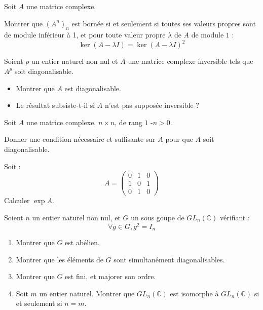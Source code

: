 \begin{exer}
Soit $A$ une matrice complexe.

Montrer que $(A^n)_n$ est bornée si et seulement si %
toutes ses valeurs propres sont de module inférieur à 1, et pour toute valeur propre $\lambda$ de $A$ de module $1$ :
\[\ker (A - \lambda I) = \ker (A - \lambda I)^2\]
\end{exer}

\begin{exer}
Soient $p$ un entier naturel non nul et $A$ une matrice complexe inversible tels que $A^p$ soit diagonalisable.
\begin{itemize}
\item Montrer que $A$ est diagonalisable.
\item Le résultat subsiste-t-il si $A$ n'est pas supposée inversible ?
\end{itemize}
\end{exer}

\begin{exer}
Soit $A$ une matrice complexe, $n\times n$, de rang $1$ -$n>0$.

Donner une condition n\'ecessaire et suffisante sur $A$ pour que $A$ soit diagonalisable.
\end{exer}

\begin{exer}
Soit : \[A=\begin{pmatrix}0&1&0\\1&0&1\\0&1&0\end{pmatrix}\]
Calculer $\exp A$.
\end{exer}

\begin{exer}
Soient $n$ un entier naturel non nul, et $G$ un sous goupe de $GL_n (\mathbb{C})$ vérifiant :
\[\forall g \in G , g^2 = I_n\]
\begin{enumerate}
\item Montrer que $G$ est abélien.
\item Montrer que les éléments de $G$ sont simultanément diagonalisables.
\item Montrer que $G$ est fini, et majorer son ordre.
\item Soit $m$ un entier naturel. %
Montrer que $GL_n (\mathbb{C})$ est isomorphe à $GL_n (\mathbb{C})$ si et seulement si $n = m$.
\end{enumerate}
\end{exer}

